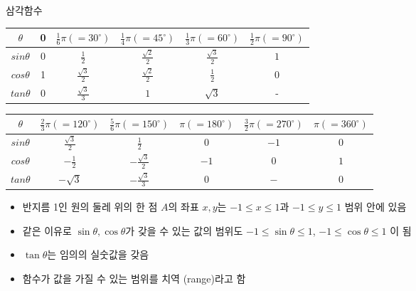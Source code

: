 \documentclass[10pt,t]{beamer}
\begin{document}
\begin{frame}{삼각함수}
\pagebreak
\begin{table}
    \begin{tabular}{|c|c|c|c|c|c|} \hline
        $\theta$ & 0 & $\frac{1}{6}\pi (=30^\circ)$ & $\frac{1}{4}\pi (=45^\circ)$ & $\frac{1}{3}\pi (=60^\circ)$ & $\frac{1}{2}\pi (=90^\circ)$ \\ \hline
        $sin\theta$ & 0 & $\frac{1}{2}$& $\frac{\sqrt{2}}{2}$& $\frac{\sqrt{3}}{2}$& $1$\\ \hline
        $cos\theta$ & 1 & $\frac{\sqrt{3}}{2}$& $\frac{\sqrt{2}}{2}$& $\frac{1}{2}$& $0$\\ \hline
        $tan\theta$ & 0 & $\frac{\sqrt{3}}{3}$& $1$& $\sqrt{3}$& -\\ \hline
    \end{tabular}
\end{table}
\begin{table}
    \begin{tabular}{|c|c|c|c|c|c|} \hline
        $\theta$ & $\frac{2}{3}\pi (=120^\circ)$ & $\frac{5}{6}\pi (=150^\circ)$ & $\pi (=180^\circ)$ & $\frac{3}{2}\pi (=270^\circ)$ & $\pi (=360^\circ)$ \\ \hline
        $sin\theta$ & $\frac{\sqrt{3}}{2}$ & $\frac{1}{2}$& 0& $-1$& $0$\\ \hline
        $cos\theta$ & $-\frac{1}{2}$ & $-\frac{\sqrt{3}}{2}$& $-1$& $0$& $1$\\ \hline
        $tan\theta$ & $-\sqrt{3}$ & $-\frac{\sqrt{3}}{3}$& $0$& $-$& $0$\\ \hline
    \end{tabular}
\end{table}

\pagebreak
\begin{itemize}
    \item 반지름 1인 원의 둘레 위의 한 점 $A$의 좌표 $x, y$는 $-1 \leq x \leq 1$과 $-1 \leq y \leq 1$ 범위 안에 있음
    \item 같은 이유로 $\sin \theta, \cos \theta$가 갖을 수 있는 값의 범위도 $-1 \leq \sin \theta \leq 1$, $-1 \leq \cos \theta \leq 1$ 이 됨
    \item $\tan \theta$는 임의의 실숫값을 갖음
    \item 함수가 값을 가질 수 있는 범위를 치역 (range)라고 함
\end{itemize}


\end{frame}
\end{document}
